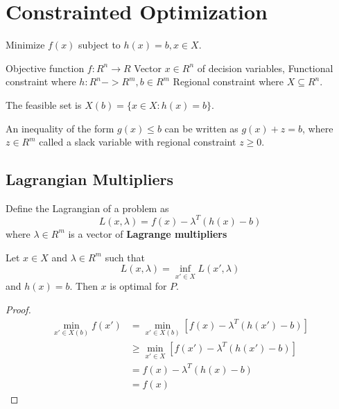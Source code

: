 
\chapter{Constrainted Optimization}
\label{cha:constr-optim}

Minimize $f(x)$ subject to $h(x) = b, x \in X$.  

Objective function $f: R^{n} \rightarrow R$
Vector $x \in R^{n}$ of decision variables,
Functional constraint where $h: R^{n} -> R^{m}, b \in R^{m}$
Regional constraint where $X \subseteq R^{n}$.

\begin{defn}
  \label{defn:1}
  The feasible set is $X(b) = \{ x \in X : h(x) = b \}$.
\end{defn}

An inequality of the form $g(x) \leq b$ can be written as $g(x) + z =
b$, where $z \in R^{m}$ called a slack variable with regional
constraint $z \geq 0$.

\section{Lagrangian Multipliers}
\label{sec:lagr-mult}

\begin{defn}
  \label{defn:2}
  Define the Lagrangian of a problem  as
  \begin{equation}
    \label{eq:1}
    L(x, \lambda) = f(x) - \lambda^{T}(h(x) - b)
  \end{equation} where $\lambda \in R^{m}$ is a vector of
  \textbf{Lagrange multipliers}
\end{defn}

\begin{thm}
  Let $x \in X$ and $\lambda \in R^{m}$ such that
  \begin{equation}
    \label{eq:2}
    L(x, \lambda) = \inf_{x' \in X} L(x', \lambda)
  \end{equation} and $h(x) = b$.  Then $x$ is optimal for $P$.
\end{thm}

\begin{proof}
  \begin{align}
    \label{eq:3}
    \min_{x' \in X(b)} f(x') &= \min_{x' \in X(b)} [f(x) - \lambda^{T}(h(x') - b)] \\
                             &\geq \min_{x' \in X} [ f(x') - \lambda^{T}(h(x') - b)] \\
                             &= f(x) - \lambda^{T}(h(x) - b) \\
                             &= f(x)
  \end{align}
\end{proof}

